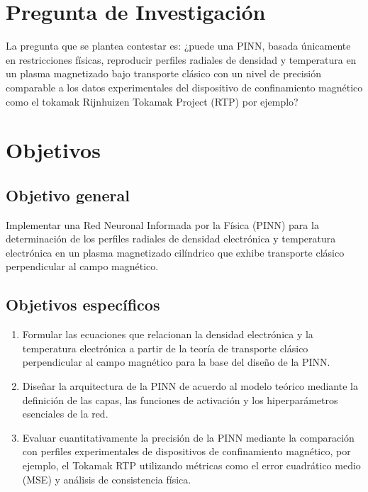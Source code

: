 \section{Pregunta de Investigación}

La pregunta que se plantea contestar es: ¿puede una PINN, basada únicamente en restricciones físicas, reproducir perfiles radiales de densidad y temperatura en un plasma magnetizado bajo transporte clásico con un nivel de precisión comparable a los datos experimentales del dispositivo de confinamiento magnético como el tokamak Rijnhuizen Tokamak Project (RTP) por ejemplo?

\section{Objetivos}

\subsection*{Objetivo general}
Implementar una Red Neuronal Informada por la Física (PINN) para la determinación de los perfiles radiales de densidad electrónica y temperatura electrónica en un plasma magnetizado cilíndrico que exhibe transporte clásico perpendicular al campo magnético.

\subsection*{Objetivos específicos}

	\begin{enumerate}
		\item Formular las ecuaciones que relacionan la densidad electrónica y la temperatura electrónica a partir de la teoría de transporte clásico perpendicular al campo magnético para la base del diseño de la PINN.
		\item Diseñar la arquitectura de la PINN de acuerdo al modelo teórico mediante la definición de las capas, las funciones de activación y los hiperparámetros esenciales de la red. 
		\item   Evaluar cuantitativamente la precisión de la PINN mediante la comparación con perfiles experimentales de dispositivos de confinamiento magnético, por ejemplo, el  Tokamak RTP utilizando métricas como el error cuadrático medio (MSE) y análisis de consistencia física.
	\end{enumerate}


